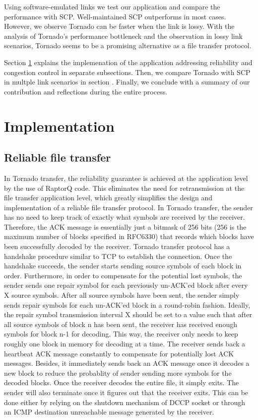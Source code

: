 \documentclass{sig-alternate-10pt}
\begin{document}
Using software-emulated links we test our application and compare the
performance with SCP. Well-maintained SCP outperforms in most cases. However, we
observe Tornado can be faster when the link is lossy. With the analysis of
Tornado's performance bottleneck and the observation in lossy link scenarios,
Tornado seems to be a promising alternative as a file transfer protocol.

Section \ref{s:impl} explains the implemenation of the application addressing
reliability and congestion control in separate subsections. Then, we compare
Tornado with SCP in multple link scenarios in section \label{s:eval}. Finally,
we conclude with a summary of our contribution and reflections during the entire
process.

\section{Implementation}\label{s:impl}

\subsection{Reliable file transfer} 

In Tornado transfer, the reliability guarantee is achieved at the application
level by the use of RaptorQ code. This eliminates the need for retransmission at
the file transfer application level, which greatly simplifies the design and
implementation of a reliable file transfer protocol. In Tornado transfer, the
sender has no need to keep track of exactly what symbols are received by the
receiver. Therefore, the ACK message is essentially just a bitmask of 256 bits
(256 is the maximum number of blocks specified in RFC6330) that records which
blocks have been successfully decoded by the receiver. Tornado transfer protocol
has a handshake procedure similar to TCP to establish the connection. Once the
handshake succeeds, the sender starts sending source symbols of each block in
order. Furthermore, in order to compensate for the potential lost symbols, the
sender sends one repair symbol for each previously un-ACK'ed block after every X
source symbols. After all source symbols have been sent, the sender simply sends
repair symbols for each un-ACK'ed block in a round-robin fashion. Ideally, the
repair symbol transmission interval X should be set to a value such that after
all source symbols of block n has been sent, the receiver has received enough
symbols for block n-1 for decoding. This way, the receiver only needs to keep
roughly one block in memory for decoding at a time. The receiver sends back a
heartbeat ACK message constantly to compensate for potentially lost ACK
messages. Besides, it immediately sends back an ACK message once it decodes a
new block to reduce the probablity of sender sending more symbols for the
decoded blocks. Once the receiver decodes the entire file, it simply exits. The
sender will also terminate once it figures out that the receiver exits. This can
be done either by relying on the shutdown mechanism of DCCP socket or through an
ICMP destination unreachable message generated by the receiver.
\end{document}
